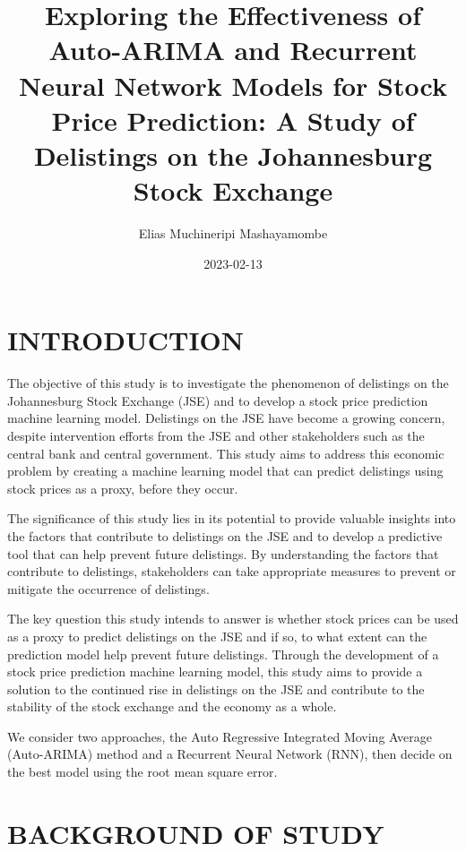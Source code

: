 \documentclass[
]{article}
\title{Exploring the Effectiveness of Auto-ARIMA and Recurrent Neural
Network Models for Stock Price Prediction: A Study of Delistings on the
Johannesburg Stock Exchange}
\author{Elias Muchineripi Mashayamombe}
\date{2023-02-13}
\begin{document}
\maketitle

\newpage

\hypertarget{introduction}{%
\section{INTRODUCTION}\label{introduction}}

The objective of this study is to investigate the phenomenon of
delistings on the Johannesburg Stock Exchange (JSE) and to develop a
stock price prediction machine learning model. Delistings on the JSE
have become a growing concern, despite intervention efforts from the JSE
and other stakeholders such as the central bank and central government.
This study aims to address this economic problem by creating a machine
learning model that can predict delistings using stock prices as a
proxy, before they occur.

The significance of this study lies in its potential to provide valuable
insights into the factors that contribute to delistings on the JSE and
to develop a predictive tool that can help prevent future delistings. By
understanding the factors that contribute to delistings, stakeholders
can take appropriate measures to prevent or mitigate the occurrence of
delistings.

The key question this study intends to answer is whether stock prices
can be used as a proxy to predict delistings on the JSE and if so, to
what extent can the prediction model help prevent future delistings.
Through the development of a stock price prediction machine learning
model, this study aims to provide a solution to the continued rise in
delistings on the JSE and contribute to the stability of the stock
exchange and the economy as a whole.

We consider two approaches, the Auto Regressive Integrated Moving
Average (Auto-ARIMA) method and a Recurrent Neural Network (RNN), then
decide on the best model using the root mean square error.

\hypertarget{background-of-study}{%
\section{BACKGROUND OF STUDY}\label{background-of-study}}
\end{document}
